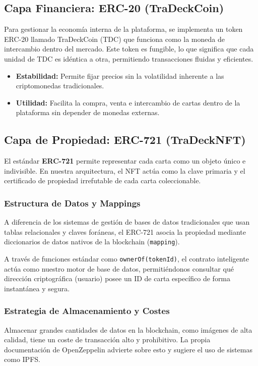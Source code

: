 \subsection{Capa Financiera: ERC-20 (TraDeckCoin)}
Para gestionar la economía interna de la plataforma, se implementa un token ERC-20 \textbf{\cite{openzeppelin_erc20}} llamado TraDeckCoin (TDC) que
funciona como la moneda de intercambio dentro del mercado. Este token es fungible, lo que significa que cada unidad 
de TDC es idéntica a otra, permitiendo transacciones fluidas y eficientes.

\begin{itemize}
    \item \textbf{Estabilidad:} Permite fijar precios sin la volatilidad inherente a las criptomonedas tradicionales.
    \item \textbf{Utilidad:} Facilita la compra, venta e intercambio de cartas dentro de la plataforma sin depender 
    de monedas externas. 
\end{itemize}

\subsection{Capa de Propiedad: ERC-721 (TraDeckNFT)}
El estándar \textbf{ERC-721} \cite{openzeppelin_erc721} permite representar cada carta como un objeto 
único e indivisible. En nuestra arquitectura, el NFT actúa como la clave primaria y el certificado de 
propiedad irrefutable\textbf{\cite{antonopoulos2018mastering}} de cada carta coleccionable.

\subsubsection{Estructura de Datos y Mappings}
A diferencia de los sistemas de gestión de bases de datos tradicionales que usan tablas relacionales 
y claves foráneas, el ERC-721 asocia la propiedad mediante diccionarios de datos nativos de la 
blockchain (\verb|mapping|).

A través de funciones estándar como \verb|ownerOf(tokenId)|, el contrato inteligente actúa como nuestro motor 
de base de datos, permitiéndonos consultar qué dirección criptográfica (usuario) posee un ID de carta 
específico de forma instantánea y segura.

\subsubsection{Estrategia de Almacenamiento y Costes}
Almacenar grandes cantidades de datos en la blockchain, como imágenes de alta calidad, tiene un coste de 
transacción alto y prohibitivo. La propia documentación de OpenZeppelin advierte sobre esto y sugiere el uso 
de sistemas como IPFS.

